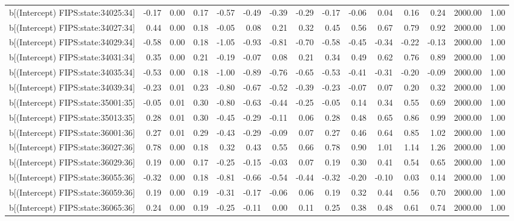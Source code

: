 \begin{table}[ht]
\begin{tabular}{rrrrrrrrrrrrrrr}
  b[(Intercept) FIPS:state:34025:34] & -0.17 & 0.00 & 0.17 & -0.57 & -0.49 & -0.39 & -0.29 & -0.17 & -0.06 & 0.04 & 0.16 & 0.24 & 2000.00 & 1.00 \\ 
  b[(Intercept) FIPS:state:34027:34] & 0.44 & 0.00 & 0.18 & -0.05 & 0.08 & 0.21 & 0.32 & 0.45 & 0.56 & 0.67 & 0.79 & 0.92 & 2000.00 & 1.00 \\ 
  b[(Intercept) FIPS:state:34029:34] & -0.58 & 0.00 & 0.18 & -1.05 & -0.93 & -0.81 & -0.70 & -0.58 & -0.45 & -0.34 & -0.22 & -0.13 & 2000.00 & 1.00 \\ 
  b[(Intercept) FIPS:state:34031:34] & 0.35 & 0.00 & 0.21 & -0.19 & -0.07 & 0.08 & 0.21 & 0.34 & 0.49 & 0.62 & 0.76 & 0.89 & 2000.00 & 1.00 \\ 
  b[(Intercept) FIPS:state:34035:34] & -0.53 & 0.00 & 0.18 & -1.00 & -0.89 & -0.76 & -0.65 & -0.53 & -0.41 & -0.31 & -0.20 & -0.09 & 2000.00 & 1.00 \\ 
  b[(Intercept) FIPS:state:34039:34] & -0.23 & 0.01 & 0.23 & -0.80 & -0.67 & -0.52 & -0.39 & -0.23 & -0.07 & 0.07 & 0.20 & 0.32 & 2000.00 & 1.00 \\ 
  b[(Intercept) FIPS:state:35001:35] & -0.05 & 0.01 & 0.30 & -0.80 & -0.63 & -0.44 & -0.25 & -0.05 & 0.14 & 0.34 & 0.55 & 0.69 & 2000.00 & 1.00 \\ 
  b[(Intercept) FIPS:state:35013:35] & 0.28 & 0.01 & 0.30 & -0.45 & -0.29 & -0.11 & 0.06 & 0.28 & 0.48 & 0.65 & 0.86 & 0.99 & 2000.00 & 1.00 \\ 
  b[(Intercept) FIPS:state:36001:36] & 0.27 & 0.01 & 0.29 & -0.43 & -0.29 & -0.09 & 0.07 & 0.27 & 0.46 & 0.64 & 0.85 & 1.02 & 2000.00 & 1.00 \\ 
  b[(Intercept) FIPS:state:36027:36] & 0.78 & 0.00 & 0.18 & 0.32 & 0.43 & 0.55 & 0.66 & 0.78 & 0.90 & 1.01 & 1.14 & 1.26 & 2000.00 & 1.00 \\ 
  b[(Intercept) FIPS:state:36029:36] & 0.19 & 0.00 & 0.17 & -0.25 & -0.15 & -0.03 & 0.07 & 0.19 & 0.30 & 0.41 & 0.54 & 0.65 & 2000.00 & 1.00 \\ 
  b[(Intercept) FIPS:state:36055:36] & -0.32 & 0.00 & 0.18 & -0.81 & -0.66 & -0.54 & -0.44 & -0.32 & -0.20 & -0.10 & 0.03 & 0.14 & 2000.00 & 1.00 \\ 
  b[(Intercept) FIPS:state:36059:36] & 0.19 & 0.00 & 0.19 & -0.31 & -0.17 & -0.06 & 0.06 & 0.19 & 0.32 & 0.44 & 0.56 & 0.70 & 2000.00 & 1.00 \\ 
  b[(Intercept) FIPS:state:36065:36] & 0.24 & 0.00 & 0.19 & -0.25 & -0.11 & 0.00 & 0.11 & 0.25 & 0.38 & 0.48 & 0.61 & 0.74 & 2000.00 & 1.00 \\ 

\end{tabular}
\end{table}
